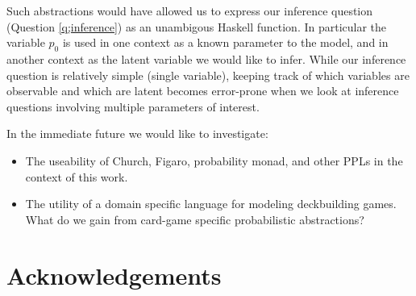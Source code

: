 Such abstractions would have allowed
us to express our inference question (Question \ref{q;inference}) as an
unambigous Haskell function. In particular the variable $p_0$ is used in
one context as a known parameter to the model, and in another context as
the latent variable we would like to infer. While our inference question
is relatively simple (single variable), keeping track of which variables
are observable and which are latent becomes error-prone when we look at
inference questions involving multiple parameters of interest.




In the immediate future we would like to investigate:

\begin{itemize}
\item The useability of Church, Figaro, probability monad, and other
      PPLs in the context of this work.
\item The utility of a domain specific language for modeling deckbuilding
      games. What do we gain from card-game specific probabilistic
      abstractions?
\end{itemize}


\section{Acknowledgements} \label{sec:ack}

